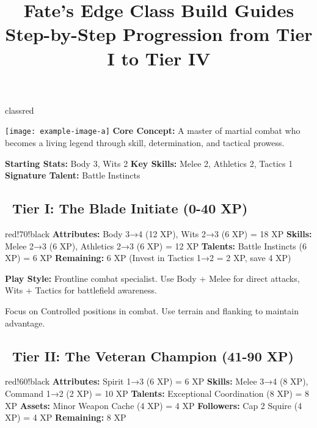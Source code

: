 \documentclass[11pt]{article}
\title{\Huge\textbf{Fate's Edge Class Build Guides}\\
\Large Step-by-Step Progression from Tier I to Tier IV}
\author{}
\date{}
\begin{document}
\maketitle

\begin{center}
\end{center}

\newpage

\begin{classguide}{classred}
\begin{multicols}{2}
\texttt{[image: example-image-a]}
\columnbreak
\textbf{Core Concept:} A master of martial combat who becomes a living legend through skill, determination, and tactical prowess.

\textbf{Starting Stats:} Body 3, Wits 2
\textbf{Key Skills:} Melee 2, Athletics 2, Tactics 1
\textbf{Signature Talent:} Battle Instincts
\end{multicols}

\subsection*{\faStar\ Tier I: The Blade Initiate (0-40 XP)}
\begin{tierbox}{red!70!black}
\textbf{Attributes:} Body 3→4 (12 XP), Wits 2→3 (6 XP) = 18 XP
\textbf{Skills:} Melee 2→3 (6 XP), Athletics 2→3 (6 XP) = 12 XP
\textbf{Talents:} Battle Instincts (6 XP) = 6 XP
\textbf{Remaining:} 6 XP (Invest in Tactics 1→2 = 2 XP, save 4 XP)
\end{tierbox}

\textbf{Play Style:} Frontline combat specialist. Use Body + Melee for direct attacks, Wits + Tactics for battlefield awareness.

\begin{tipbox}
Focus on Controlled positions in combat. Use terrain and flanking to maintain advantage.
\end{tipbox}

\subsection*{\faStar\faStar\ Tier II: The Veteran Champion (41-90 XP)}
\begin{tierbox}{red!60!black}
\textbf{Attributes:} Spirit 1→3 (6 XP) = 6 XP
\textbf{Skills:} Melee 3→4 (8 XP), Command 1→2 (2 XP) = 10 XP
\textbf{Talents:} Exceptional Coordination (8 XP) = 8 XP
\textbf{Assets:} Minor Weapon Cache (4 XP) = 4 XP
\textbf{Followers:} Cap 2 Squire (4 XP) = 4 XP
\textbf{Remaining:} 8 XP
\end{tierbox}


\end{classguide}
\end{document}
